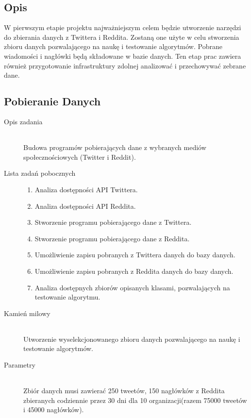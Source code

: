 \documentclass[a4paper,11pt, notitlepage ]{article}
\begin{document}
\subsection{Opis} 
W pierwszym etapie projektu najważniejszym celem będzie utworzenie narzędzi do zbierania danych z Twittera i Reddita. Zostaną one użyte w celu stworzenia zbioru danych pozwalającego na naukę i testowanie algorytmów. Pobrane wiadomości i nagłówki będą składowane w bazie danych. Ten etap prac zawiera również przygotowanie infrastruktury zdolnej analizować i przechowywać zebrane dane.

\subsection{Pobieranie Danych}
    \begin{description}
        \item[Opis zadania] \hfill \\ Budowa programów pobierających dane z wybranych mediów społecznościowych (Twitter i Reddit).
         
        \item[Lista zadań pobocznych] \hfill 
        \begin{enumerate}
            \item Analiza dostępności API Twittera.
            \item Analiza dostępności API Reddita.
            \item Stworzenie programu pobierającego dane z Twittera.
            \item Stworzenie programu pobierającego dane z Reddita.
            \item Umożliwienie zapisu pobranych z Twittera danych do bazy danych.
            \item Umożliwienie zapisu pobranych z Reddita danych do bazy danych.
            \item Analiza dostępnych zbiorów opisanych klasami, pozwalających na testowanie algorytmu.
        \end{enumerate}

        \item[Kamień milowy] \hfill \\
        Utworzenie wyselekcjonowanego zbioru danych pozwalającego na naukę i testowanie algorytmów.

        \item[Parametry] \hfill \\ 
        Zbiór danych musi zawierać 250 tweetów, 150 nagłówków z Reddita zbieranych codziennie przez 30 dni dla 10 organizacji(razem 75000 tweetów i 45000 nagłówków).
        

\end{description}
\end{document}
